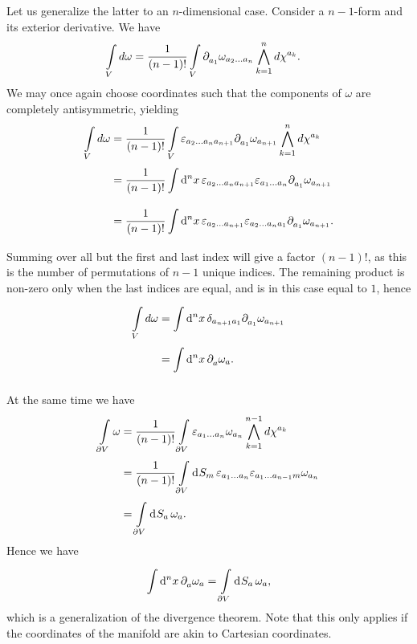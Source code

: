 Let us generalize the latter to an $n$-dimensional case. Consider a $n - 1$-form and its exterior derivative. We have
\begin{align*}
	\int\limits_{V}d\omega &= \frac{1}{(n - 1)!}\int\limits_{V}\partial^{}_{a_{1}}\omega_{a_{2}\dots a_{n}}\bigwedge\limits_{k = 1}^{n}d\chi^{a_{k}}.
\end{align*}
We may once again choose coordinates such that the components of $\omega$ are completely antisymmetric, yielding
\begin{align*}
	\int\limits_{V}d\omega &= \frac{1}{(n - 1)!}\int\limits_{V}\varepsilon_{a_{2}\dots a_{n}a_{n + 1}}\partial^{}_{a_{1}}\omega_{a_{n + 1}}\bigwedge\limits_{k = 1}^{n}d\chi^{a_{k}} \\
	                        &= \frac{1}{(n - 1)!}\int\limits_{}^{}\dd[n]{x}\varepsilon_{a_{2}\dots a_{n}a_{n + 1}}\varepsilon_{a_{1}\dots a_{n}}\partial^{}_{a_{1}}\omega_{a_{n + 1}} \\
	                        &= \frac{1}{(n - 1)!}\int\limits_{}^{}\dd[n]{x}\varepsilon_{a_{2}\dots a_{n + 1}}\varepsilon_{a_{2}\dots a_{n}a_{1}}\partial^{}_{a_{1}}\omega_{a_{n + 1}}.
\end{align*}
Summing over all but the first and last index will give a factor $(n - 1)!$, as this is the number of permutations of $n - 1$ unique indices. The remaining product is non-zero only when the last indices are equal, and is in this case equal to $1$, hence
\begin{align*}
\int\limits_{V}d\omega &= \int\limits_{}^{}\dd[n]{x}\delta_{a_{n + 1}a_{1}}\partial^{}_{a_{1}}\omega_{a_{n + 1}} \\
                        &= \int\limits_{}^{}\dd[n]{x}\partial^{}_{a}\omega_{a}.
\end{align*}

At the same time we have
\begin{align*}
	\int\limits_{\partial V}\omega &= \frac{1}{(n - 1)!}\int\limits_{\partial V}\varepsilon_{a_{1}\dots a_{n}}\omega_{a_{n}}\bigwedge\limits_{k = 1}^{n - 1}d\chi^{a_{k}} \\
	                           &= \frac{1}{(n - 1)!}\int\limits_{\partial V}^{}\dd[]{S_{m}}\varepsilon_{a_{1}\dots a_{n}}\varepsilon_{a_{1}\dots a_{n - 1}m}\omega_{a_{n}} \\
	                           &= \int\limits_{\partial V}^{}\dd[]{S_{a}}\omega_{a}.
\end{align*}
Hence we have
\begin{align*}
	\int\limits_{}^{}\dd[n]{x}\partial^{}_{a}\omega_{a} = \int\limits_{\partial V}^{}\dd[]{S_{a}}\omega_{a},
\end{align*}
which is a generalization of the divergence theorem. Note that this only applies if the coordinates of the manifold are akin to Cartesian coordinates.